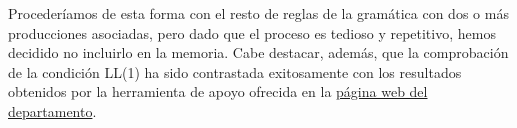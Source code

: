 Procederíamos de esta forma con el resto de reglas de la gramática con dos o más producciones asociadas, pero dado que el proceso es tedioso y repetitivo, hemos decidido no incluirlo en la memoria. Cabe destacar, además, que la comprobación de la condición LL(1) ha sido contrastada exitosamente con los resultados obtenidos por la herramienta de apoyo ofrecida en la \href{https://dlsiis.fi.upm.es/procesadores/Herramientas.html}{página web del departamento}.\\